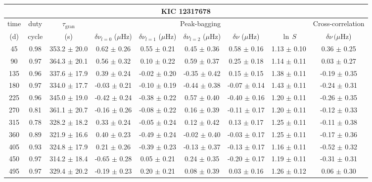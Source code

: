 \documentclass[twocolumn]{aastex61}%
\begin{document}
\begin{table*}[ht]\centering\fontsize{9.}{7.}\selectfont
\begin{tabular}{ccc|ccccc|c}
\multicolumn{9}{c}{KIC 12317678}\\ \hline\hline
time & duty & $\tau_\text{gran}$ &\multicolumn{5}{c|}{Peak-bagging}&Cross-correlation\\
(d)& cycle & (s)&$\delta\nu_{l=0}$ ($\mu$Hz) & $\delta\nu_{l=1}$ ($\mu$Hz) & $\delta\nu_{l=2}$ ($\mu$Hz) & $\delta\nu$ ($\mu$Hz)& $\ln\,S$ & $\delta\nu\,(\mu$Hz)\\\hline
45 & 0.98 & 353.2 $\pm$ 20.0 & 0.62 $\pm$ 0.26 & 0.55 $\pm$ 0.21 & 0.45 $\pm$ 0.36 & 0.58 $\pm$ 0.16 & 1.13 $\pm$ 0.10 & 0.36 $\pm$ 0.25\\
90 & 0.97 & 364.3 $\pm$ 20.1 & 0.56 $\pm$ 0.32 & 0.10 $\pm$ 0.22 & 0.59 $\pm$ 0.37 & 0.25 $\pm$ 0.18 & 1.14 $\pm$ 0.11 & 0.03 $\pm$ 0.27\\
135 & 0.96 & 337.6 $\pm$ 17.9 & 0.39 $\pm$ 0.24 & -0.02 $\pm$ 0.20 & -0.35 $\pm$ 0.42 & 0.15 $\pm$ 0.15 & 1.38 $\pm$ 0.11 & -0.19 $\pm$ 0.35\\
180 & 0.97 & 334.0 $\pm$ 17.7 & -0.03 $\pm$ 0.21 & -0.10 $\pm$ 0.19 & -0.44 $\pm$ 0.38 & -0.07 $\pm$ 0.14 & 1.43 $\pm$ 0.11 & -0.24 $\pm$ 0.31\\
225 & 0.96 & 345.0 $\pm$ 19.0 & -0.42 $\pm$ 0.24 & -0.38 $\pm$ 0.22 & 0.57 $\pm$ 0.40 & -0.40 $\pm$ 0.16 & 1.20 $\pm$ 0.11 & -0.26 $\pm$ 0.35\\
270 & 0.81 & 361.1 $\pm$ 20.7 & -0.16 $\pm$ 0.26 & -0.08 $\pm$ 0.22 & 0.16 $\pm$ 0.39 & -0.11 $\pm$ 0.17 & 1.20 $\pm$ 0.11 & -0.12 $\pm$ 0.33\\
315 & 0.78 & 328.2 $\pm$ 18.2 & 0.33 $\pm$ 0.24 & -0.05 $\pm$ 0.24 & 0.12 $\pm$ 0.42 & 0.13 $\pm$ 0.17 & 1.25 $\pm$ 0.11 & -0.11 $\pm$ 0.38\\
360 & 0.89 & 321.9 $\pm$ 16.6 & 0.40 $\pm$ 0.23 & -0.49 $\pm$ 0.24 & -0.02 $\pm$ 0.40 & -0.03 $\pm$ 0.17 & 1.25 $\pm$ 0.11 & -0.17 $\pm$ 0.36\\
405 & 0.93 & 324.8 $\pm$ 17.9 & 0.21 $\pm$ 0.26 & -0.39 $\pm$ 0.23 & -0.13 $\pm$ 0.37 & -0.13 $\pm$ 0.17 & 1.16 $\pm$ 0.11 & -0.52 $\pm$ 0.32\\
450 & 0.97 & 314.2 $\pm$ 18.4 & -0.65 $\pm$ 0.28 & 0.05 $\pm$ 0.21 & 0.24 $\pm$ 0.35 & -0.20 $\pm$ 0.17 & 1.19 $\pm$ 0.11 & -0.31 $\pm$ 0.31\\
495 & 0.97 & 329.4 $\pm$ 20.2 & -0.19 $\pm$ 0.23 & 0.20 $\pm$ 0.21 & 0.08 $\pm$ 0.39 & 0.03 $\pm$ 0.16 & 1.26 $\pm$ 0.12 & 0.06 $\pm$ 0.30\\

\end{tabular}
\end{table*}
\end{document}
